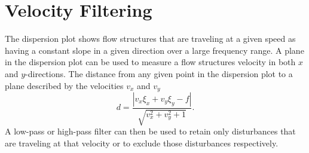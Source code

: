 \section{Velocity Filtering}
The dispersion plot shows flow structures that are traveling at a given speed as having a constant slope in a given direction over a large frequency range.
A plane in the dispersion plot can be used to measure a flow structures velocity in both $x$ and $y$-directions.
The distance from any given point in the dispersion plot to a plane described by the velocities $v_x$ and $v_y$
\begin{equation}
  d = \frac{|v_x\xi_x+v_y\xi_y-f|}{\sqrt{v_x^2+v_y^2+1}} \textrm{.}
  \label{eqn:04_dist_point_2_plane}
\end{equation}
A low-pass or high-pass filter can then be used to retain only disturbances that are traveling at that velocity or to exclude those disturbances respectively.


